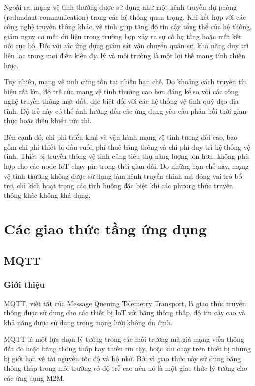Ngoài ra, mạng vệ tinh thường được sử dụng như một kênh truyền dự phòng (redundant communication) trong các hệ thống quan trọng. Khi kết hợp với các công nghệ truyền thông khác, vệ tinh giúp tăng độ tin cậy tổng thể của hệ thống, giảm nguy cơ mất dữ liệu trong trường hợp xảy ra sự cố hạ tầng hoặc mất kết nối cục bộ. Đối với các ứng dụng giám sát vận chuyển quân sự, khả năng duy trì liên lạc trong mọi điều kiện địa lý và môi trường là một lợi thế mang tính chiến lược.

Tuy nhiên, mạng vệ tinh cũng tồn tại nhiều hạn chế. Do khoảng cách truyền tín hiệu rất lớn, độ trễ của mạng vệ tinh thường cao hơn đáng kể so với các công nghệ truyền thông mặt đất, đặc biệt đối với các hệ thống vệ tinh quỹ đạo địa tĩnh. Độ trễ này có thể ảnh hưởng đến các ứng dụng yêu cầu phản hồi thời gian thực hoặc điều khiển tức thì.

Bên cạnh đó, chi phí triển khai và vận hành mạng vệ tinh tương đối cao, bao gồm chi phí thiết bị đầu cuối, phí thuê băng thông và chi phí duy trì hệ thống vệ tinh. Thiết bị truyền thông vệ tinh cũng tiêu thụ năng lượng lớn hơn, không phù hợp cho các node IoT chạy pin trong thời gian dài. Do những hạn chế này, mạng vệ tinh thường không được sử dụng làm kênh truyền chính mà đóng vai trò bổ trợ, chỉ kích hoạt trong các tình huống đặc biệt khi các phương thức truyền thông khác không khả dụng.

\section{Các giao thức tầng ứng dụng}
\subsection{MQTT}
\subsubsection{Giới thiệu}
MQTT, viết tắt của Message Queuing Telemetry Transport, là giao thức truyền thông được sử dụng cho các thiết bị IoT với băng thông thấp, độ tin cậy cao và khả năng được sử dụng trong mạng lưới không ổn định. 

MQTT là một lựa chọn lý tưởng trong các môi trường mà giá mạng viễn thông đắt đỏ hoặc băng thông thấp hay thiếu tin cậy, hoặc khi chạy trên thiết bị nhúng bị giới hạn về tài nguyên tốc độ và bộ nhớ. Bởi vì giao thức này sử dụng băng thông thấp trong môi trường có độ trễ cao nên nó là một giao thức lý tưởng cho các ứng dụng M2M.

